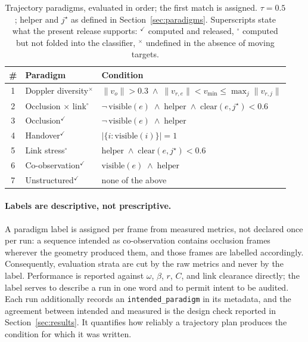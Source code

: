 \begin{table}[t]
\centering
\caption{Trajectory paradigms, evaluated in order; the first match is assigned.
$\tau = 0.5$; helper and $j^\star$ as defined in Section~\ref{sec:paradigms}.
Superscripts state what the present release supports: $^{\checkmark}$ computed
and released, $^{\circ}$ computed but not folded into the classifier,
$^{\times}$ undefined in the absence of moving targets.}
\label{tab:paradigms}
\footnotesize
\setlength{\tabcolsep}{4pt}
\begin{tabular}{@{}cll@{}}
\toprule
\# & Paradigm & Condition \\
\midrule
1 & Doppler diversity$^{\times}$      & $\lVert v_o\rVert > 0.3 \;\wedge\; \lVert v_{r,e}\rVert < v_{\min} \le \max_j \lVert v_{r,j}\rVert$ \\
2 & Occlusion $\times$ link$^{\circ}$ & $\neg\,\mathrm{visible}(e) \;\wedge\; \text{helper} \;\wedge\; \mathrm{clear}(e,j^\star) < 0.6$ \\
3 & Occlusion$^{\checkmark}$          & $\neg\,\mathrm{visible}(e) \;\wedge\; \text{helper}$ \\
4 & Handover$^{\checkmark}$           & $\lvert \{ i : \mathrm{visible}(i) \} \rvert = 1$ \\
5 & Link stress$^{\circ}$             & $\text{helper} \;\wedge\; \mathrm{clear}(e,j^\star) < 0.6$ \\
6 & Co-observation$^{\checkmark}$     & $\mathrm{visible}(e) \;\wedge\; \text{helper}$ \\
7 & Unstructured$^{\checkmark}$       & none of the above \\
\bottomrule
\end{tabular}
\end{table}

\paragraph{Labels are descriptive, not prescriptive.}
A paradigm label is assigned per frame from measured metrics, not declared once
per run: a sequence intended as co-observation contains occlusion frames
wherever the geometry produced them, and those frames are labelled accordingly.
Consequently, evaluation strata are cut by the raw metrics and never by the
label. Performance is reported against $\omega$, $\beta$, $r$, $C$, and link
clearance directly; the label serves to describe a run in one word and to permit
intent to be audited. Each run additionally records an
\texttt{intended\_paradigm} in its metadata, and the agreement between intended
and measured is the design check reported in Section~\ref{sec:results}. It
quantifies how reliably a trajectory plan produces the condition for which it
was written.

